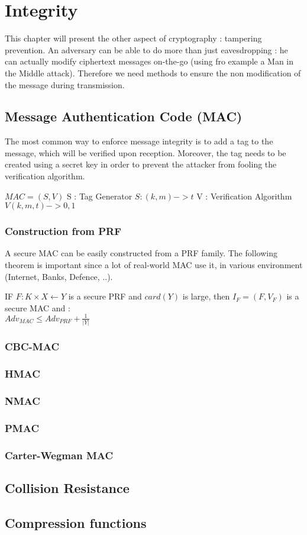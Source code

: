 \chapter{Integrity}


This chapter will present the other aspect of cryptography : tampering prevention. An adversary can be able to do more than just eavesdropping : he can actually modify ciphertext messages on-the-go (using fro example a Man in the Middle attack). Therefore we need methods to ensure the non modification of the message during transmission.

\section{Message Authentication Code (MAC)}

The most common way to enforce message integrity is to add a tag to the message, which will be verified upon reception. Moreover, the tag needs to be created using a secret key in order to prevent the attacker from fooling the verification algorithm.

$MAC = (S,V)$
S : Tag Generator
    $S: (k,m) -> t$
V : Verification Algorithm
    $V(k,m,t) -> {0,1}$
    
\subsection{Construction from PRF}

A secure MAC can be easily constructed from a PRF family. The following theorem is important since a lot of real-world MAC use it, in various environment (Internet, Banks, Defence, ..).

\begin{mytheorem}
    IF $F:K\times X \leftarrow Y$ is a secure PRF and $card(Y)$ is large, then $I_F = (F, V_F)$ is a secure MAC and : \\
    $ Adv_{MAC} \leq Adv_{PRF} + \frac{1}{|Y|} $
\end{mytheorem}


\subsection{CBC-MAC}
\subsection{HMAC}
\subsection{NMAC}
\subsection{PMAC}
\subsection{Carter-Wegman MAC}


\section{Collision Resistance}
\section{Compression functions}